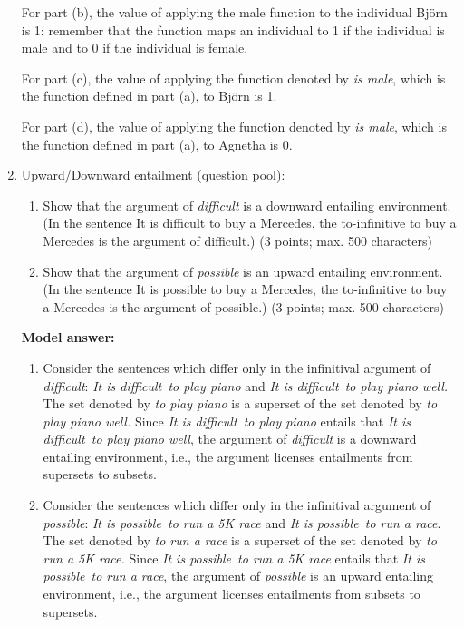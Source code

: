 \documentclass[a4,11pt]{article}
\begin{document}
\begin{enumerate}[leftmargin = 12pt]
For part (b), the value of applying the {\sf male} function to the individual Bj\"orn is 1: remember that the function maps an individual to 1 if the individual is male and to 0 if the individual is female.

For part (c), the value of applying the function denoted by {\em is male}, which is the function defined in part (a), to Bj\"orn is 1.

For part (d), the value of applying the function denoted by {\em is male}, which is the function defined in part (a), to Agnetha is 0.

\item Upward/Downward entailment (question pool):

\begin{enumerate}
\item  Show that the argument of \textit{difficult} is a downward entailing environment. (In the sentence It
is difficult to buy a Mercedes, the to-infinitive to buy a Mercedes is the argument of difficult.) (3
points; max. 500 characters)
\item Show that the argument of \textit{possible} is an upward entailing environment. (In the sentence It
is possible to buy a Mercedes, the to-infinitive to buy a Mercedes is the argument of possible.) (3
points; max. 500 characters)
\end{enumerate}

{\bf Model answer:} 
\begin{enumerate}
\item Consider the sentences which differ only in the infinitival argument of \textit{difficult}: \textit{It is difficult to play piano} and \textit{It is difficult to play piano well.} The set denoted by \textit{to play piano} is a superset of the set denoted by \textit{to play piano well.}
Since \textit{It is difficult to play piano} entails that \textit{It is difficult to play piano well}, the argument of \textit{difficult} is a downward entailing environment, i.e., the argument licenses entailments from supersets to subsets.
\item Consider the sentences which differ only in the infinitival argument of \textit{possible}: \textit{It is possible to run a 5K race}  and \textit{It is possible to run a race}. The set denoted by \textit{to run a race} is a superset of the set denoted by \textit{to run a 5K race.} Since \textit{It is possible to run a 5K race} entails that  \textit{It is possible to run a race}, the argument of \textit{possible} is an upward entailing environment, i.e., the argument licenses entailments from subsets to supersets.
\end{enumerate}

\end{enumerate}
\end{document}
